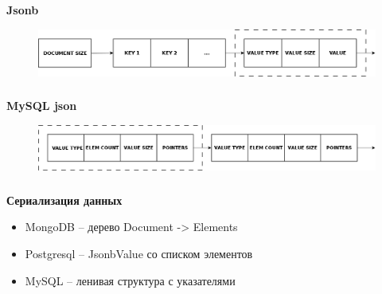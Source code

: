 \documentclass[18pt, compress, aspectratio=169]{beamer}
\begin{document}
\begin{frame}
    \frametitle{}
    \begin{center}
    \textbf{Jsonb}
    \begin{figure}
        \includegraphics[width=1.0\textwidth,center]{jsonb.png}
    \end{figure}
    \end{center}
\end{frame}


\begin{frame}
    \frametitle{}
    \begin{center}
    \textbf{MySQL json}
    \begin{figure}
        \includegraphics[width=1.0\textwidth,center]{mysql_json.png}
    \end{figure}
    \end{center}
\end{frame}

\begin{frame}
    \frametitle{}
    \textbf{Сериализация данных}
    \begin{center}
        \begin{itemize}[label={\MVRightarrow}]
            \item MongoDB -- дерево Document -> Elements
            \item Postgresql -- JsonbValue со списком элементов
            \item MySQL -- ленивая структура с указателями
        \end{itemize}
    \end{center}
\end{frame}
\end{document}
